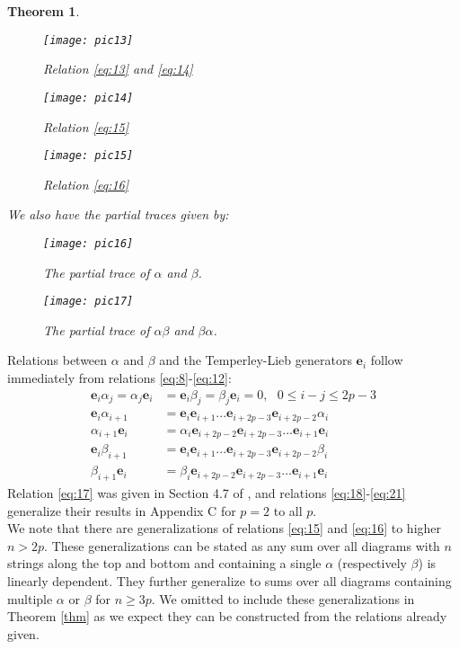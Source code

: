 \documentclass[]{article}
\newtheorem{thm}{Theorem}[section]
\begin{document}
\begin{thm}
\begin{figure}[H]
 	\centering
 	\texttt{[image: pic13]}
 	\caption{Relation \ref{eq:13} and \ref{eq:14}}
 \end{figure}
 \begin{figure}[H]
 	\centering
 	\texttt{[image: pic14]}
 	\caption{Relation \ref{eq:15}} \label{fig:rot}
 \end{figure}
 \begin{figure}[H]
 	\centering
 	\texttt{[image: pic15]}
 	\caption{Relation \ref{eq:16}}
 \end{figure}
 We also have the partial traces given by:
 \begin{figure}[H]
 	\centering
 	\texttt{[image: pic16]}
 	\caption{The partial trace of $\alpha$ and $\beta$.}
 \end{figure}
 \begin{figure}[H]
 	\centering
 	\texttt{[image: pic17]}
 	\caption{The partial trace of $\alpha\beta$ and $\beta\alpha$.} \label{fig:pt}
 \end{figure}
\end{thm}
\noindent Relations between $\alpha$ and $\beta$ and the Temperley-Lieb generators $\mathbf{e}_{i}$ follow immediately from relations \ref{eq:8}-\ref{eq:12}:
\begin{align}
\mathbf{e}_{i}\alpha_{j}=\alpha_{j} \mathbf{e}_{i}&=\mathbf{e}_{i}\beta_{j}=\beta_{j} \mathbf{e}_{i}=0, \:\:\: 0\leq i-j\leq 2p-3 \label{eq:17}\\
\mathbf{e}_{i}\alpha_{i+1}&=\mathbf{e}_{i}\mathbf{e}_{i+1}...\mathbf{e}_{i+2p-3}\mathbf{e}_{i+2p-2}\alpha_{i} \label{eq:18}\\
\alpha_{i+1}\mathbf{e}_{i}&=\alpha_{i}\mathbf{e}_{i+2p-2}\mathbf{e}_{i+2p-3}...\mathbf{e}_{i+1}\mathbf{e}_{i} \label{eq:19}\\
\mathbf{e}_{i}\beta_{i+1}&=\mathbf{e}_{i}\mathbf{e}_{i+1}...\mathbf{e}_{i+2p-3}\mathbf{e}_{i+2p-2}\beta_{i} \label{eq:20}\\
\beta_{i+1}\mathbf{e}_{i}&=\beta_{i}\mathbf{e}_{i+2p-2}\mathbf{e}_{i+2p-3}...\mathbf{e}_{i+1}\mathbf{e}_{i} \label{eq:21}
\end{align}
Relation \ref{eq:17} was given in Section 4.7 of \cite{GST}, and relations \ref{eq:18}-\ref{eq:21} generalize their results in Appendix C for $p=2$ to all $p$.\\

We note that there are generalizations of relations \ref{eq:15} and \ref{eq:16} to higher $n>2p$. These generalizations can be stated as any sum over all diagrams with $n$ strings along the top and bottom and containing a single $\alpha$ (respectively $\beta$) is linearly dependent. They further generalize to sums over all diagrams containing multiple $\alpha$ or $\beta$ for $n\geq 3p$. We omitted to include these generalizations in Theorem \ref{thm} as we expect they can be constructed from the relations already given.
\end{document}
